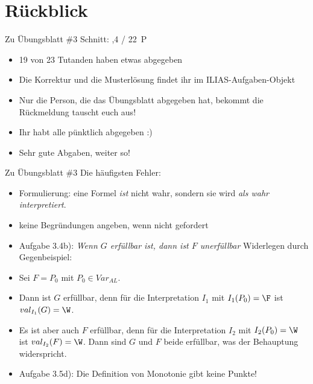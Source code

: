 
\newcommand{\handout}{}



\morescalingdelimiters




\section{Rückblick}

\begin{frame}{Zu Übungsblatt \#3}
	Schnitt: ,4 / 22~P

	\begin{itemize}[<+->]
		\item 19 von 23 Tutanden haben etwas abgegeben
		\item Die Korrektur und die Musterlösung findet ihr im ILIAS-Aufgaben-Objekt
		\item Nur die Person, die das Übungsblatt abgegeben hat, bekommt die Rückmeldung \impl tauscht euch aus!
		\item Ihr habt alle pünktlich abgegeben :)
		\item Sehr gute Abgaben, weiter so!
	\end{itemize}
\end{frame}

\begin{frame}{Zu Übungsblatt \#3}
	Die häufigsten Fehler:
	\begin{itemize}[<+->]
		\item Formulierung: eine Formel \textit{ist} nicht wahr, sondern sie wird \textit{als wahr interpretiert}.
		\item keine Begründungen angeben, wenn nicht gefordert
		\item Aufgabe 3.4b): \textit{Wenn $G$ erfüllbar ist, dann ist $F$ unerfüllbar}
		\implitem Widerlegen durch Gegenbeispiel:
		\item[] Sei $F = P_0$ mit $P_0 \in Var_{AL}$.
		\item[] Dann ist $G$ erfüllbar, denn für die Interpretation $I_1$ mit $I_1(P_0)=\F$ ist $val_{I_1}(G)=\W$.
		\item[] Es ist aber auch $F$ erfüllbar, denn für die Interpretation $I_2$ mit $I_2(P_0)=\W$ ist $val_{I_2}(F)=\W$.
		\implitem Dann sind $G$ und $F$ beide erfüllbar, was der Behauptung widerspricht.
		\item Aufgabe 3.5d): Die Definition von Monotonie gibt keine Punkte!
	\end{itemize}
\end{frame}

